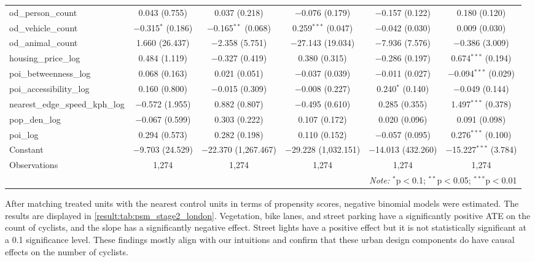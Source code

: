 \documentclass[preprint,12pt, authoryear]{elsarticle}
\begin{document}
\begin{table}[!htbp]
{\begin{tabular}{@{\extracolsep{1pt}}lccccc}
  od\_person\_count & 0.043 (0.755) & 0.037 (0.218) & $-$0.076 (0.179) & $-$0.157 (0.122) & 0.180 (0.120) \\
  od\_vehicle\_count & $-$0.315$^{*}$ (0.186) & $-$0.165$^{**}$ (0.068) & 0.259$^{***}$ (0.047) & $-$0.042 (0.030) & 0.009 (0.030) \\
  od\_animal\_count & 1.660 (26.437) & $-$2.358 (5.751) & $-$27.143 (19.034) & $-$7.936 (7.576) & $-$0.386 (3.009) \\
  housing\_price\_log & 0.484 (1.119) & $-$0.327 (0.419) & 0.380 (0.315) & $-$0.286 (0.197) & 0.674$^{***}$ (0.194) \\
  poi\_betweenness\_log & 0.068 (0.163) & 0.021 (0.051) & $-$0.037 (0.039) & $-$0.011 (0.027) & $-$0.094$^{***}$ (0.029) \\
  poi\_accessibility\_log & 0.160 (0.800) & $-$0.015 (0.309) & $-$0.008 (0.227) & 0.240$^{*}$ (0.140) & $-$0.049 (0.144) \\
  nearest\_edge\_speed\_kph\_log & $-$0.572 (1.955) & 0.882 (0.807) & $-$0.495 (0.610) & 0.285 (0.355) & 1.497$^{***}$ (0.378) \\
  pop\_den\_log & $-$0.067 (0.599) & 0.303 (0.222) & 0.107 (0.172) & 0.020 (0.096) & 0.091 (0.098) \\
  poi\_log & 0.294 (0.573) & 0.282 (0.198) & 0.110 (0.152) & $-$0.057 (0.095) & 0.276$^{***}$ (0.100) \\
  Constant & $-$9.703 (24.529) & $-$22.370 (1,267.467) & $-$29.228 (1,032.151) & $-$14.013 (432.260) & $-$15.227$^{***}$ (3.784) \\
\midrule
Observations & 1,274 & 1,274 & 1,274 & 1,274 & 1,274 \\
\bottomrule
\multicolumn{6}{r}{\textit{Note:} $^{*}$p$<$0.1; $^{**}$p$<$0.05; $^{***}$p$<$0.01} \\
\end{tabular}
}
\end{table}

After matching treated units with the nearest control units in terms of propensity scores, negative binomial models were estimated. The results are displayed in \autoref{result:tab:psm_stage2_london}.
Vegetation, bike lanes, and street parking have a significantly positive ATE on the count of cyclists, and the slope has a significantly negative effect. 
Street lights have a positive effect but it is not statistically significant at a 0.1 significance level. These findings mostly align with our intuitions and confirm that these urban design components do have causal effects on the number of cyclists.
\end{document}
